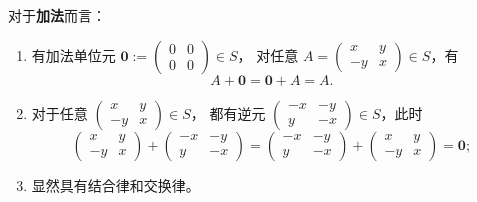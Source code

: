\begin{question}
\begin{solution}
对于\textbf{加法}而言：
\begin{enumerate}
  \item 有加法单位元 \(\mathbf{0}:=\begin{pmatrix}0&0\\0&0\end{pmatrix}\in S\)，
  对任意 \(A=\begin{pmatrix}x&y\\-y&x\end{pmatrix}\in S\)，有
  \[
  A+\mathbf0=\mathbf0+A=A.
  \]
  \item 对于任意 \(\begin{pmatrix}x&y\\-y&x\end{pmatrix}\in S\)，
  都有逆元 \(\begin{pmatrix}-x&-y\\y&-x\end{pmatrix}\in S\)，此时
  \[
  \begin{pmatrix}x&y\\-y&x\end{pmatrix}+\begin{pmatrix}-x&-y\\y&-x\end{pmatrix}
  =\begin{pmatrix}-x&-y\\y&-x\end{pmatrix}+\begin{pmatrix}x&y\\-y&x\end{pmatrix}
  =\mathbf{0};
  \]
  \item 显然具有结合律和交换律。
\end{enumerate}


\end{solution}
\end{question}
